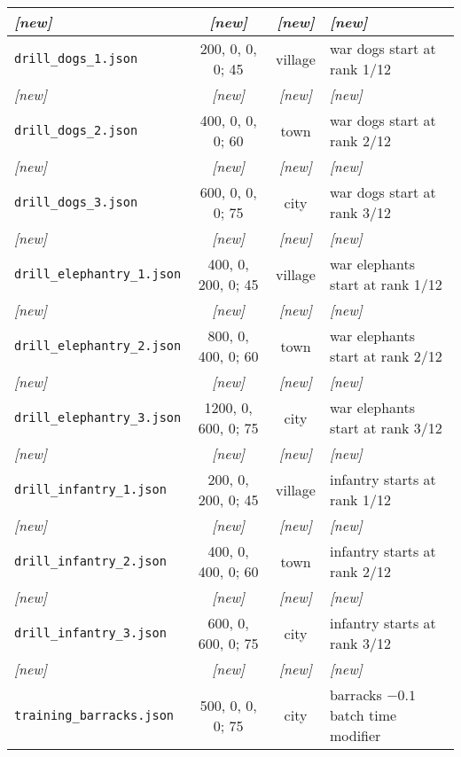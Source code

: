 \documentclass{article}
\begin{document}
\begin{tabular}{l|cc|l}
\emph{[new]} & \emph{[new]} & \emph{[new]} & \emph{[new]} \\
\hline
\verb+drill_dogs_1.json+                     &   200,    0,    0,    0;  45  & village    & war dogs start at rank 1/12 \\
\emph{[new]} & \emph{[new]} & \emph{[new]} & \emph{[new]} \\
\hline
\verb+drill_dogs_2.json+                     &   400,    0,    0,    0;  60  & town       & war dogs start at rank 2/12 \\
\emph{[new]} & \emph{[new]} & \emph{[new]} & \emph{[new]} \\
\hline
\verb+drill_dogs_3.json+                     &   600,    0,    0,    0;  75  & city       & war dogs start at rank 3/12 \\
\emph{[new]} & \emph{[new]} & \emph{[new]} & \emph{[new]} \\
\hline
\verb+drill_elephantry_1.json+               &   400,    0,  200,    0;  45  & village    & war elephants start at rank 1/12 \\
\emph{[new]} & \emph{[new]} & \emph{[new]} & \emph{[new]} \\
\hline
\verb+drill_elephantry_2.json+               &   800,    0,  400,    0;  60  & town       & war elephants start at rank 2/12 \\
\emph{[new]} & \emph{[new]} & \emph{[new]} & \emph{[new]} \\
\hline
\verb+drill_elephantry_3.json+               &  1200,    0,  600,    0;  75  & city       & war elephants start at rank 3/12 \\
\emph{[new]} & \emph{[new]} & \emph{[new]} & \emph{[new]} \\
\hline
\verb+drill_infantry_1.json+                 &   200,    0,  200,    0;  45  & village    & infantry starts at rank 1/12 \\
\emph{[new]} & \emph{[new]} & \emph{[new]} & \emph{[new]} \\
\hline
\verb+drill_infantry_2.json+                 &   400,    0,  400,    0;  60  & town       & infantry starts at rank 2/12 \\
\emph{[new]} & \emph{[new]} & \emph{[new]} & \emph{[new]} \\
\hline
\verb+drill_infantry_3.json+                 &   600,    0,  600,    0;  75  & city       & infantry starts at rank 3/12 \\
\emph{[new]} & \emph{[new]} & \emph{[new]} & \emph{[new]} \\
\hline
\verb+training_barracks.json+                &   500,    0,    0,    0;  75  & city       & barracks $-0.1$ batch time modifier \\ %

\end{tabular}
\end{document}
